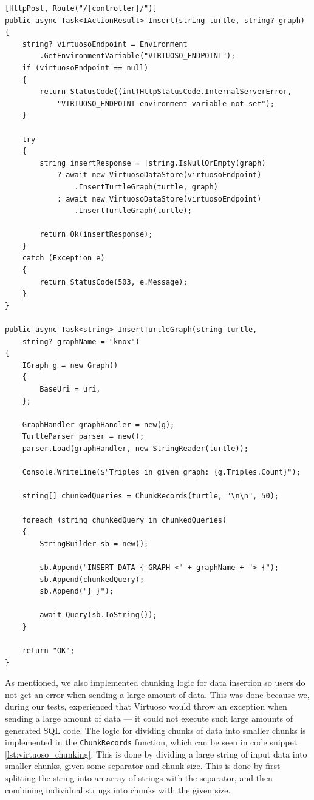 \begin{lstlisting}[language=CSharp, caption={Data insertion endpoint and data insertion logic.}, label={lst:virtuoso_data_insertion}]
[HttpPost, Route("/[controller]/")]
public async Task<IActionResult> Insert(string turtle, string? graph)
{
    string? virtuosoEndpoint = Environment
        .GetEnvironmentVariable("VIRTUOSO_ENDPOINT");
    if (virtuosoEndpoint == null)
    {
        return StatusCode((int)HttpStatusCode.InternalServerError, 
            "VIRTUOSO_ENDPOINT environment variable not set");
    }

    try
    {
        string insertResponse = !string.IsNullOrEmpty(graph) 
            ? await new VirtuosoDataStore(virtuosoEndpoint)
                .InsertTurtleGraph(turtle, graph) 
            : await new VirtuosoDataStore(virtuosoEndpoint)
                .InsertTurtleGraph(turtle);

        return Ok(insertResponse);
    }
    catch (Exception e)
    {
        return StatusCode(503, e.Message);
    }
}

public async Task<string> InsertTurtleGraph(string turtle, 
    string? graphName = "knox")
{
    IGraph g = new Graph()
    {
        BaseUri = uri,
    };
    
    GraphHandler graphHandler = new(g);
    TurtleParser parser = new();
    parser.Load(graphHandler, new StringReader(turtle));
    
    Console.WriteLine($"Triples in given graph: {g.Triples.Count}");

    string[] chunkedQueries = ChunkRecords(turtle, "\n\n", 50);

    foreach (string chunkedQuery in chunkedQueries)
    {
        StringBuilder sb = new();
        
        sb.Append("INSERT DATA { GRAPH <" + graphName + "> {");
        sb.Append(chunkedQuery);
        sb.Append("} }");

        await Query(sb.ToString());
    }

    return "OK";
}
\end{lstlisting}


As mentioned, we also implemented chunking logic for data insertion so users do not get an error when sending a large amount of data. 
This was done because we, during our tests, experienced that Virtuoso would throw an exception when sending a large amount of data --- it could not execute such large amounts of generated SQL code. The logic for dividing chunks of data into smaller chunks is implemented in the \texttt{ChunkRecords} function, which can be seen in code snippet \ref{lst:virtuoso_chunking}. This is done by dividing a large string of input data into smaller chunks, given some separator and chunk size. This is done by first splitting the string into an array of strings with the separator, and then combining individual strings into chunks with the given size.

